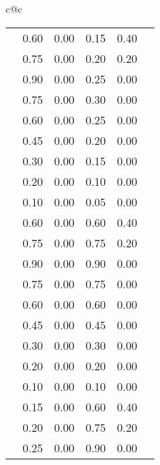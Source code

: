 %
%
%
%
\begin{footnotesize}
\begin{tabular}{c@{\quad}c}
  \begin{tabular}{|c|c|cccc|} \hline
\clspc
\clrow{verydeepseagreen}        & 0.60 & 0.00 & 0.15 & 0.40 \\
\clrow{deepseagreen}            & 0.75 & 0.00 & 0.20 & 0.20 \\
\clrow{verydarkseagreen}        & 0.90 & 0.00 & 0.25 & 0.00 \\
\clrow{darkseagreen}            & 0.75 & 0.00 & 0.30 & 0.00 \\
\clrow{seagreen}                & 0.60 & 0.00 & 0.25 & 0.00 \\
\clrow{lightseagreen}           & 0.45 & 0.00 & 0.20 & 0.00 \\
\clrow{verylightseagreen}       & 0.30 & 0.00 & 0.15 & 0.00 \\
\clrow{paleseagreen}            & 0.20 & 0.00 & 0.10 & 0.00 \\
\clrow{verypaleseagreen}        & 0.10 & 0.00 & 0.05 & 0.00 \\
\clspc
\clrow{verydeepgreen}           & 0.60 & 0.00 & 0.60 & 0.40 \\
\clrow{deepgreen}               & 0.75 & 0.00 & 0.75 & 0.20 \\
\clrow{verydarkgreen}           & 0.90 & 0.00 & 0.90 & 0.00 \\
\clrow{darkgreen}               & 0.75 & 0.00 & 0.75 & 0.00 \\
\clrow{green}                   & 0.60 & 0.00 & 0.60 & 0.00 \\
\clrow{lightgreen}              & 0.45 & 0.00 & 0.45 & 0.00 \\
\clrow{verylightgreen}          & 0.30 & 0.00 & 0.30 & 0.00 \\
\clrow{palegreen}               & 0.20 & 0.00 & 0.20 & 0.00 \\
\clrow{verypalegreen}           & 0.10 & 0.00 & 0.10 & 0.00 \\
\clspc
\clrow{verydeeplimegreen}       & 0.15 & 0.00 & 0.60 & 0.40 \\
\clrow{deeplimegreen}           & 0.20 & 0.00 & 0.75 & 0.20 \\
\clrow{verydarklimegreen}       & 0.25 & 0.00 & 0.90 & 0.00 \\

\end{tabular}
\end{tabular}
\end{footnotesize}

